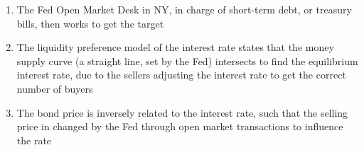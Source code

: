 \documentclass[11 pt, twoside]{article}
\begin{document}
\begin{enumerate}
\begin{enumerate}
\item The Fed Open Market Desk in NY, in charge of short-term debt, or treasury bills, then works to get the target
\item The liquidity preference model of the interest rate states that the money supply curve (a straight line, set by the Fed) intersects to find the equilibrium interest rate, due to the sellers adjusting the interest rate to get the correct number of buyers
\item The bond price is inversely related to the interest rate, such that the selling price in changed by the Fed through open market transactions to influence the rate
\end{enumerate}
\end{enumerate}
\end{document}
